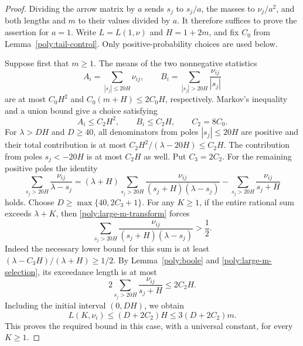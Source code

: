 \begin{proof}
Dividing the arrow matrix by $a$ sends $s_j$ to $s_j/a$, the masses to
$\nu_j/a^2$, and both lengths and $m$ to their values divided by $a$.
It therefore suffices to prove the assertion for $a=1$. Write
$L=L(1,\nu)$ and $H=1+2m$, and fix $C_0$ from
Lemma~\ref{poly:tail-control}. Only positive-probability choices are
used below.

Suppose first that $m\geq1$. The means of the two nonnegative
statistics
\[
 A_i=\sum_{|s_j|\leq20H}\nu_{ij},\qquad
 B_i=\sum_{|s_j|>20H}\frac{\nu_{ij}}{|s_j|}
\]
are at most $C_0H^2$ and $C_0(m+H)\leq2C_0H$, respectively.
Markov's inequality and a union bound give a choice satisfying
\begin{equation}\label{poly:large-m-selection}
 A_i\leq C_2H^2,\qquad B_i\leq C_2H,
 \qquad C_2=8C_0.
\end{equation}
For $\lambda>DH$ and $D\geq40$, all denominators from poles
$|s_j|\leq20H$ are positive and their total contribution is at most
$C_2H^2/(\lambda-20H)\leq C_2H$. The contribution from poles
$s_j<-20H$ is at most $C_2H$ as well. Put $C_3=2C_2$.
For the remaining positive poles the identity
\begin{equation}\label{poly:large-m-transform}
 \sum_{s_j>20H}\frac{\nu_{ij}}{\lambda-s_j}
 = (\lambda+H)\sum_{s_j>20H}
       \frac{\nu_{ij}}{(s_j+H)(\lambda-s_j)}
       -\sum_{s_j>20H}\frac{\nu_{ij}}{s_j+H}
\end{equation}
holds. Choose $D\geq\max\{40,2C_3+1\}$. For any $K\geq1$, if
the entire rational sum exceeds $\lambda+K$, then
\eqref{poly:large-m-transform} forces
\[
 \sum_{s_j>20H}\frac{\nu_{ij}}{(s_j+H)(\lambda-s_j)}>\frac12.
\]
Indeed the necessary lower bound for this sum is at least
$(\lambda-C_3H)/(\lambda+H)\geq1/2$. By
Lemma~\ref{poly:boole} and \eqref{poly:large-m-selection}, its
exceedance length is at most
\[
 2\sum_{s_j>20H}\frac{\nu_{ij}}{s_j+H}\leq2C_2H.
\]
Including the initial
interval $(0,DH)$, we obtain
\begin{equation}\label{poly:large-m-conclusion}
 L(K,\nu_i)\leq(D+2C_2)H\leq3(D+2C_2)m.
\end{equation}
This proves the required bound in this case, with a universal constant,
for every $K\geq1$.


\end{proof}
